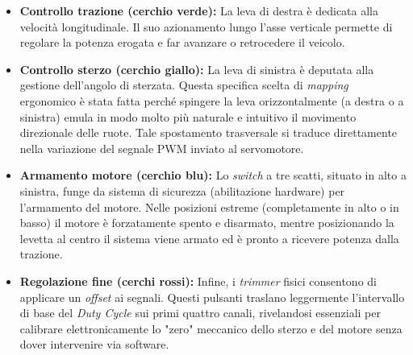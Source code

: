 \documentclass[11pt]{report}
\begin{document}
\begin{itemize}
    \item \textbf{Controllo trazione (cerchio verde):} La leva di destra è dedicata alla velocità longitudinale. Il suo azionamento lungo l'asse verticale permette di regolare la potenza erogata e far avanzare o retrocedere il veicolo.
    
    \item \textbf{Controllo sterzo (cerchio giallo):} La leva di sinistra è deputata alla gestione dell'angolo di sterzata. Questa specifica scelta di \textit{mapping} ergonomico è stata fatta perché spingere la leva orizzontalmente (a destra o a sinistra) emula in modo molto più naturale e intuitivo il movimento direzionale delle ruote. Tale spostamento trasversale si traduce direttamente nella variazione del segnale PWM inviato al servomotore.
    
    \item \textbf{Armamento motore (cerchio blu):} Lo \textit{switch} a tre scatti, situato in alto a sinistra, funge da sistema di sicurezza (abilitazione hardware) per l'armamento del motore. Nelle posizioni estreme (completamente in alto o in basso) il motore è forzatamente spento e disarmato, mentre posizionando la levetta al centro il sistema viene armato ed è pronto a ricevere potenza dalla trazione.
    
    \item \textbf{Regolazione fine (cerchi rossi):} Infine, i \textit{trimmer} fisici consentono di applicare un \textit{offset} ai segnali. Questi pulsanti traslano leggermente l'intervallo di base del \textit{Duty Cycle} sui primi quattro canali, rivelandosi essenziali per calibrare elettronicamente lo "zero" meccanico dello sterzo e del motore senza dover intervenire via software.
\end{itemize}
\end{document}
